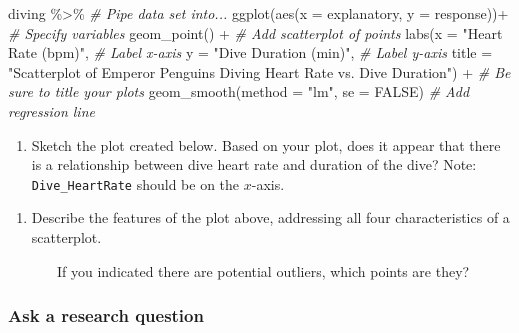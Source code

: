 \documentclass[
]{report}
\newenvironment{Shaded}{\begin{snugshade}}{\end{snugshade}}
\newcommand{\AttributeTok}[1]{\textcolor[rgb]{0.77,0.63,0.00}{#1}}
\newcommand{\CommentTok}[1]{\textcolor[rgb]{0.56,0.35,0.01}{\textit{#1}}}
\newcommand{\ConstantTok}[1]{\textcolor[rgb]{0.00,0.00,0.00}{#1}}
\newcommand{\FunctionTok}[1]{\textcolor[rgb]{0.00,0.00,0.00}{#1}}
\newcommand{\NormalTok}[1]{#1}
\newcommand{\SpecialCharTok}[1]{\textcolor[rgb]{0.00,0.00,0.00}{#1}}
\newcommand{\StringTok}[1]{\textcolor[rgb]{0.31,0.60,0.02}{#1}}
\providecommand{\tightlist}{%
  \setlength{\itemsep}{0pt}\setlength{\parskip}{0pt}}
\begin{document}
\begin{Shaded}
\begin{Highlighting}[]
\NormalTok{diving }\SpecialCharTok{\%\textgreater{}\%} \CommentTok{\# Pipe data set into...}
\FunctionTok{ggplot}\NormalTok{(}\FunctionTok{aes}\NormalTok{(}\AttributeTok{x =}\NormalTok{ explanatory, }\AttributeTok{y =}\NormalTok{ response))}\SpecialCharTok{+}  \CommentTok{\# Specify variables}
  \FunctionTok{geom\_point}\NormalTok{() }\SpecialCharTok{+}  \CommentTok{\# Add scatterplot of points}
  \FunctionTok{labs}\NormalTok{(}\AttributeTok{x =} \StringTok{"Heart Rate (bpm)"}\NormalTok{,  }\CommentTok{\# Label x{-}axis}
       \AttributeTok{y =} \StringTok{"Dive Duration (min)"}\NormalTok{,  }\CommentTok{\# Label y{-}axis}
       \AttributeTok{title =} \StringTok{"Scatterplot of Emperor Penguins Diving Heart Rate vs. Dive Duration"}\NormalTok{) }\SpecialCharTok{+} 
               \CommentTok{\# Be sure to title your plots}
  \FunctionTok{geom\_smooth}\NormalTok{(}\AttributeTok{method =} \StringTok{"lm"}\NormalTok{, }\AttributeTok{se =} \ConstantTok{FALSE}\NormalTok{)  }\CommentTok{\# Add regression line}
\end{Highlighting}
\end{Shaded}

\begin{enumerate}
\def\labelenumi{\arabic{enumi}.}
\setcounter{enumi}{1}
\tightlist
\item
  Sketch the plot created below. Based on your plot, does it appear that there is a relationship between dive heart rate and duration of the dive? Note: \texttt{Dive\_HeartRate} should be on the \(x\)-axis.
\end{enumerate}

\vspace{2in}

\begin{enumerate}
\def\labelenumi{\arabic{enumi}.}
\setcounter{enumi}{2}
\tightlist
\item
  Describe the features of the plot above, addressing all four characteristics of a scatterplot.
\end{enumerate}

\vspace{1in}

~~~~~~~If you indicated there are potential outliers, which points are they?

\vspace{0.5in}

\hypertarget{ask-a-research-question-5}{%
\subsubsection*{Ask a research question}\label{ask-a-research-question-5}}
\end{document}
